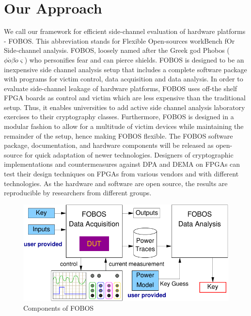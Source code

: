 \documentclass{llncs}
\numberwithin{algorithm}{chapter}
\begin{document}
\section{Our Approach}
We call our framework for efficient side-channel evaluation of 
hardware platforms - FOBOS. This abbreviation stands for
Flexible Open-sources workBench fOr Side-channel analysis.
FOBOS, loosely named after the Greek god Phobos ($\phi \acute{o} \beta o \varsigma$)
who personifies fear and can pierce shields. FOBOS is designed to be an inexpensive 
side channel analysis setup that includes a complete software package with programs for 
victim control, data acquisition and data analysis. In order to evaluate
side-channel leakage of hardware platforms, FOBOS uses off-the shelf FPGA boards
as control and victim which are less expensive than the traditional setup.
Thus, it enables universities to add active side channel analysis laboratory exercises
to their cryptography classes. 
Furthermore, FOBOS is designed in a modular fashion 
to allow for a multitude of victim devices while maintaining the remainder of the setup,
hence making FOBOS flexible. 
The FOBOS software package, documentation, and hardware components will be released
as open-source for quick adaptation of newer technologies.
Designers of cryptographic implementations and countermeasures against DPA and DEMA on FPGAs 
can test their design techniques on FPGAs from various vendors and with different technologies.
As the hardware and software are open source, the results are 
reproducible by researchers from different groups.
%
\begin{figure}[ht]
\vspace{-2ex}
\begin{center}
\includegraphics[scale=0.8]{figures/fobos-top}
\caption{\label{fig:fobos-top}Components of FOBOS}
\end{center} 
\vspace{-3ex}
\end{figure}
\end{document}

